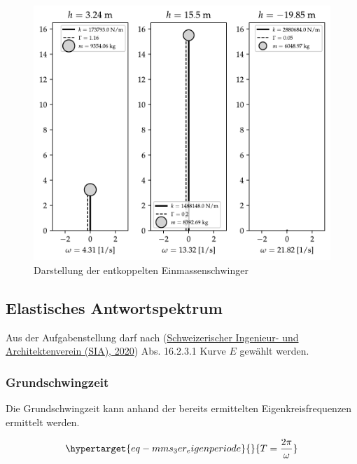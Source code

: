 \documentclass[
  letterpaper,
  DIV=11]{scrreprt}
\begin{document}
\begin{figure}[H]

{\centering \includegraphics{index_files/mediabag/mms_04_files/figure-pdf/fig-mms_3_modale_ems-output-1.pdf}

}

\caption{\label{fig-mms_3_modale_ems}Darstellung der entkoppelten
Einmassenschwinger}

\end{figure}

\hypertarget{elastisches-antwortspektrum}{%
\subsection{Elastisches
Antwortspektrum}\label{elastisches-antwortspektrum}}

Aus der Aufgabenstellung darf nach
(\protect\hyperlink{ref-SIA261_2020}{Schweizerischer Ingenieur- und
Architektenverein (SIA), 2020}) Abs. 16.2.3.1 Kurve \(E\) gewählt
werden.

\hypertarget{grundschwingzeit}{%
\subsubsection{Grundschwingzeit}\label{grundschwingzeit}}

Die Grundschwingzeit kann anhand der bereits ermittelten
Eigenkreisfrequenzen ermittelt werden.

\begin{equation}\protect\hypertarget{eq-mms_3er_eigenperiode}{}{
T = \frac{2 \pi}{\omega}
}\label{eq-mms_3er_eigenperiode}\end{equation}
\end{document}
